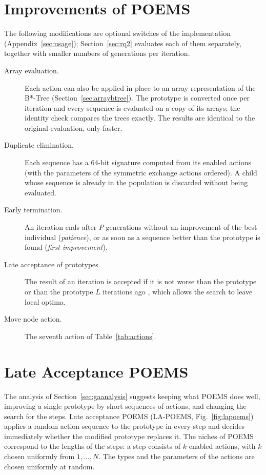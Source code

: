 \section{Improvements of POEMS}
\label{sec:improvements}

The following modifications are optional switches of the implementation (Appendix~\ref{sec:usage}); Section~\ref{sec:rq2} evaluates each of them separately, together with smaller numbers of generations per iteration.

\begin{description}
\item[Array evaluation.] Each action can also be applied in place to an array representation of the B*-Tree (Section~\ref{sec:arraybtree}). The prototype is converted once per iteration and every sequence is evaluated on a copy of its arrays; the identity check compares the trees exactly. The results are identical to the original evaluation, only faster.
\item[Duplicate elimination.] Each sequence has a 64-bit signature computed from its enabled actions (with the parameters of the symmetric exchange actions ordered). A child whose sequence is already in the population is discarded without being evaluated.
\item[Early termination.] An iteration ends after $P$ generations without an improvement of the best individual ({\em patience}), or as soon as a sequence better than the prototype is found ({\em first improvement}).
\item[Late acceptance of prototypes.] The result of an iteration is accepted if it is not worse than the prototype or than the prototype $L$ iterations ago \cite{lahc}, which allows the search to leave local optima.
\item[Move node action.] The seventh action of Table~\ref{tab:actions}.
\end{description}

\section{Late Acceptance POEMS}
\label{sec:lapoems}

The analysis of Section~\ref{sec:gaanalysis} suggests keeping what POEMS does well, improving a single prototype by short sequences of actions, and changing the search for the steps. Late acceptance POEMS (LA-POEMS, Fig.~\ref{fig:lapoems}) applies a random action sequence to the prototype in every step and decides immediately whether the modified prototype replaces it. The niches of POEMS correspond to the lengths of the steps: a step consists of $k$ enabled actions, with $k$ chosen uniformly from $1, \dots, N$. The types and the parameters of the actions are chosen uniformly at random.


